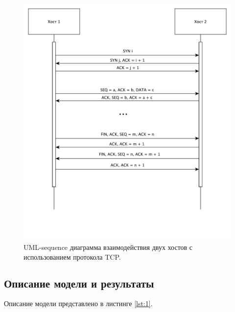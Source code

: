 \begin{figure}[H]
	\centering
	\includegraphics[width=\textwidth]{inc/1.pdf}
	\caption{ UML-sequence диаграмма взаимодействия двух хостов с использованием протокола TCP. }
	\label{img:1}
\end{figure}

\subsection{Описание модели и результаты}

Описание модели представлено в листинге \ref{lst:1}.

